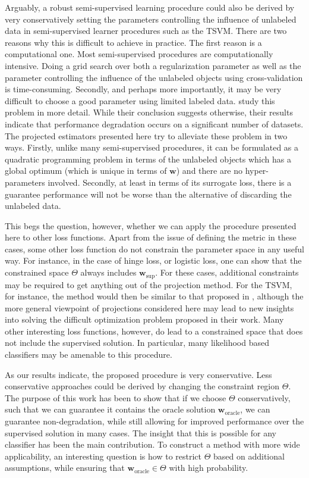 \documentclass{article}
\renewcommand{\vec}[1]{\mathbf{#1}}
\begin{document}
Arguably, a robust semi-supervised learning procedure could also be derived by very conservatively setting the parameters controlling the influence of unlabeled data in semi-supervised learner procedures such as the TSVM. There are two reasons why this is difficult to achieve in practice. The first reason is a computational one. Most semi-supervised procedures are computationally intensive. Doing a grid search over both a regularization parameter as well as the parameter controlling the influence of the unlabeled objects using cross-validation is time-consuming. Secondly, and perhaps more importantly, it may be very difficult to choose a good parameter using limited labeled data. \citep{Goldberg2009} study this problem in more detail. While their conclusion suggests otherwise, their results indicate that performance degradation occurs on a significant number of datasets. The projected estimators presented here try to alleviate these problem in two ways. Firstly, unlike many semi-supervised procedures, it can be formulated as a quadratic programming problem in terms of the unlabeled objects which has a global optimum (which is unique in terms of $\vec{w}$) and there are no hyper-parameters involved. Secondly, at least in terms of its surrogate loss, there is a guarantee performance will not be worse than the alternative of discarding the unlabeled data.

This begs the question, however, whether we can apply the procedure presented here to other loss functions. Apart from the issue of defining the metric in these cases, some other loss function do not constrain the parameter space in any useful way. For instance, in the case of hinge loss, or logistic loss, one can show that the constrained space $\Theta$ always includes $\vec{w}_\text{sup}$. For these cases, additional constraints may be required to get anything out of the projection method. For the TSVM, for instance, the method would then be similar to that proposed in \citep{Li2011}, although the more general viewpoint of projections considered here may lead to new insights into solving the difficult optimization problem proposed in their work. Many other interesting loss functions, however, do lead to a constrained space that does not include the supervised solution. In particular, many likelihood based classifiers may be amenable to this procedure.

As our results indicate, the proposed procedure is very conservative. Less conservative approaches could be derived by changing the constraint region $\Theta$. The purpose of this work has been to show that if we choose $\Theta$ conservatively, such that we can guarantee it contains the oracle solution $\vec{w}_\text{oracle}$, we can guarantee non-degradation, while still allowing for improved performance over the supervised solution in many cases. The insight that this is possible for any classifier has been the main contribution. To construct a method with more wide applicability, an interesting question is how to restrict $\Theta$ based on additional assumptions, while ensuring that $\vec{w}_\text{oracle} \in \Theta$ with high probability.
\end{document}
